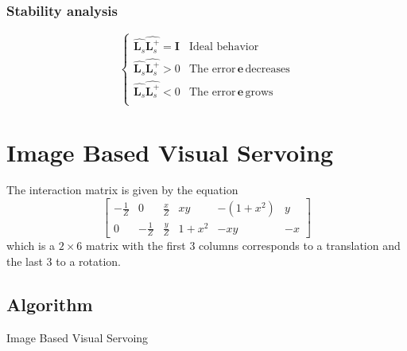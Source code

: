 \documentclass[a4paper,12pt]{article}
\begin{document}
\subsubsection{Stability analysis}
\begin{equation}
        \begin{cases}
                \widehat{\mathbf{L}_s}\widehat{\mathbf{L}_s^+} = \mathbf{I} 
                        & \text{Ideal behavior} \\
                \widehat{\mathbf{L}_s}\widehat{\mathbf{L}_s^+} >0 & 
                        \text{The error}\, \mathbf{e}\, \text{decreases} \\
                \widehat{\mathbf{L}_s}\widehat{\mathbf{L}_s^+} < 0 & 
                        \text{The error}\, \mathbf{e}\, \text{grows} \\
        \end{cases}
\end{equation}
\section{Image Based Visual Servoing}  
The interaction matrix is given by the equation
\begin{equation}
\begin{bmatrix} 
        -\frac{1}{Z}  & 0 & \frac{x}{Z} & xy & -(1+x^2) & y\\
        0 & -\frac{1}{Z} & \frac{y}{Z} & 1 +x^2 & -x y & -x
\end{bmatrix}
\label{eq:ibvsim} 
\end{equation}
which is a $2 \times 6$ matrix with the first 3 columns corresponds to a translation and the last 3 to a rotation.
\subsection{Algorithm}
\begin{algorithm}[H]
 \caption{Image Based Visual Servoing}
\end{algorithm}
\end{document}
